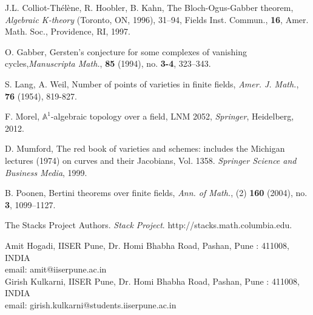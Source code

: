 \documentclass[10pt]{amsart}
\theoremstyle{plain}
\theoremstyle{definition}
\newcommand{\A}{{\mathbb A}}
\begin{document}
\begin{thebibliography}{AAAA}



J.L. Colliot-Th\'el\`ene, R. Hoobler, B. Kahn, The Bloch-Ogus-Gabber theorem,  {\it Algebraic K-theory} (Toronto, ON, 1996), 31--94, 
Fields Inst. Commun., {\bf 16}, Amer. Math. Soc., Providence, RI, 1997. 

O. Gabber, Gersten's conjecture for some complexes of vanishing cycles,{\it  Manuscripta Math.}, {\bf 85} (1994), no. {\bf 3-4}, 323--343.

S. Lang, A. Weil, Number of points of varieties in finite fields, {\it Amer. J. Math.}, {\bf 76} (1954), 819-827.

F. Morel, $\A^1$-algebraic topology over a field,  LNM {2052}, {\it Springer}, Heidelberg, 2012.

D. Mumford, The red book of varieties and schemes: includes the Michigan lectures (1974) on curves and their Jacobians, Vol. 1358. {\it Springer Science and Business Media}, 1999.

 B. Poonen, Bertini theorems over finite fields, {\it Ann. of Math.}, (2) {\bf 160} (2004), no. {\bf 3}, 1099--1127.

The Stacks Project Authors. {\it Stack Project}. http://stacks.math.columbia.edu.

\end{thebibliography}
\vspace{1.5cm}
\begin{center}
Amit Hogadi, IISER Pune, Dr. Homi Bhabha Road, Pashan, Pune : 411008, INDIA\\
email: amit@iiserpune.ac.in\\
\vspace{0.3cm}
Girish Kulkarni, IISER Pune, Dr. Homi Bhabha Road, Pashan, Pune : 411008, INDIA\\
email: girish.kulkarni@students.iiserpune.ac.in
\end{center}
\end{document}
